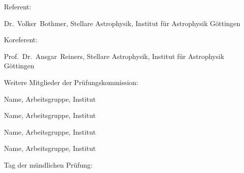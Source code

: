 \noindent Referent:

Dr.~Volker~Bothmer, Stellare Astrophysik, Institut für Astrophysik Göttingen
\vspace{\baselineskip}

\noindent Koreferent:

Prof.~Dr.~Ansgar~Reiners, Stellare Astrophysik, Institut für Astrophysik Göttingen
% 
% 
\vspace{\baselineskip}

\noindent Weitere Mitglieder der Prüfungskommission:
\vspace{\baselineskip}

Name, Arbeitsgruppe, Institut
\vspace{\baselineskip}

Name, Arbeitsgruppe, Institut
\vspace{\baselineskip}

Name, Arbeitsgruppe, Institut
\vspace{\baselineskip}

Name, Arbeitsgruppe, Institut
\vspace{3\baselineskip}

\noindent Tag der mündlichen Prüfung: \underline{\hspace{3cm}}


\cleardoublepage


% 
% 
% 




